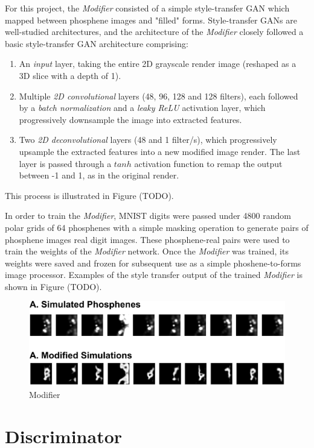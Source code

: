 \documentclass[a4paper,11pt,openany]{book}
\begin{document}
For this project, the \emph{Modifier} consisted of a simple style-transfer GAN which mapped between phosphene images and "filled" forms.
Style-transfer GANs are well-studied architectures, and the architecture of the \emph{Modifier} closely followed a basic style-transfer GAN architecture comprising:
\begin{enumerate}
\item An \emph{input} layer, taking the entire 2D grayscale render image (reshaped as a 3D slice with a depth of 1).
\item Multiple \emph{2D convolutional} layers (48, 96, 128 and 128 filters), each followed by a \emph{batch normalization} and a \emph{leaky ReLU} activation layer, which progressively downsample the image into extracted features.
\item Two \emph{2D deconvolutional} layers (48 and 1 filter/s), which progressively upsample the extracted features into a new modified image render.
The last layer is passed through a \(tanh\) activation function to remap the output between -1 and 1, as in the original render.
\end{enumerate}
This process is illustrated in Figure (TODO).

In order to train the \emph{Modifier}, MNIST digits were passed under 4800 random polar grids of 64 phosphenes with a simple masking operation to generate pairs of phosphene images real digit images.
These phosphene-real pairs were used to train the weights of the \emph{Modifier} network.
Once the \emph{Modifier} was trained, its weights were saved and frozen for subsequent use as a simple phoshene-to-forms image processor.
Examples of the style transfer output of the trained \emph{Modifier} is shown in Figure (TODO).


\begin{figure}[htbp]
\centering
\includegraphics[width=.9\linewidth]{./images/methods_modifier_examples.png}
\caption{\label{fig:orgacaac3b}
Modifier}
\end{figure}

\section*{Discriminator}
\label{sec:org5cd9f42}
\end{document}
